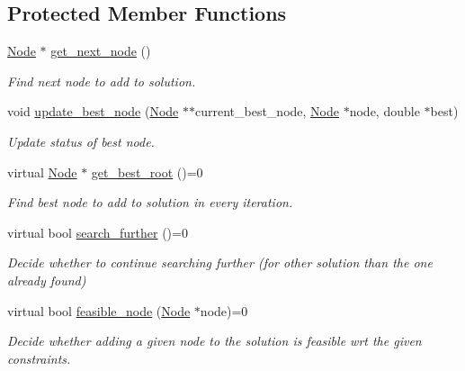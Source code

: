 \subsection*{Protected Member Functions}
\begin{DoxyCompactItemize}
\item 
\hyperlink{namespacederegnet_a744bad34f2de9856d36715a445f027f3}{Node} $\ast$ \hyperlink{classderegnet_1_1DeregnetStartHeuristic_a6ec478444151e54625951f858ff76761}{get\+\_\+next\+\_\+node} ()
\begin{DoxyCompactList}\small\item\em Find next node to add to solution. \end{DoxyCompactList}\item 
void \hyperlink{classderegnet_1_1DeregnetStartHeuristic_a50179ff9db4d416b93ff41d1dcee1358}{update\+\_\+best\+\_\+node} (\hyperlink{namespacederegnet_a744bad34f2de9856d36715a445f027f3}{Node} $\ast$$\ast$current\+\_\+best\+\_\+node, \hyperlink{namespacederegnet_a744bad34f2de9856d36715a445f027f3}{Node} $\ast$node, double $\ast$best)
\begin{DoxyCompactList}\small\item\em Update status of \textquotesingle{}best\textquotesingle{} node. \end{DoxyCompactList}\item 
virtual \hyperlink{namespacederegnet_a744bad34f2de9856d36715a445f027f3}{Node} $\ast$ \hyperlink{classderegnet_1_1DeregnetStartHeuristic_a372be86d0fb8ac94bd926a1f4d09e102}{get\+\_\+best\+\_\+root} ()=0
\begin{DoxyCompactList}\small\item\em Find best node to add to solution in every iteration. \end{DoxyCompactList}\item 
virtual bool \hyperlink{classderegnet_1_1DeregnetStartHeuristic_ac3ee2c3022512f9d4ec7a6b49358e60a}{search\+\_\+further} ()=0
\begin{DoxyCompactList}\small\item\em Decide whether to continue searching further (for other solution than the one already found) \end{DoxyCompactList}\item 
virtual bool \hyperlink{classderegnet_1_1DeregnetStartHeuristic_ac296c4f122f7d3ad2fcc2cbb0d1b5379}{feasible\+\_\+node} (\hyperlink{namespacederegnet_a744bad34f2de9856d36715a445f027f3}{Node} $\ast$node)=0
\begin{DoxyCompactList}\small\item\em Decide whether adding a given node to the solution is feasible wrt the given constraints. \end{DoxyCompactList}\end{DoxyCompactItemize}
